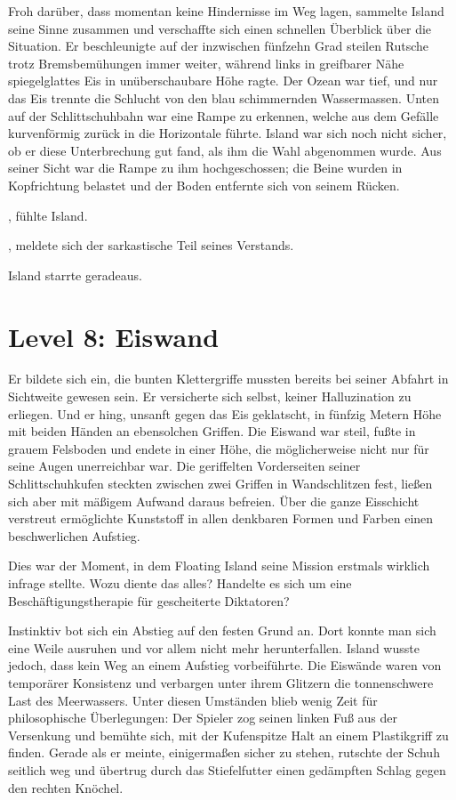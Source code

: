 Froh darüber, dass momentan keine Hindernisse im Weg lagen, sammelte Island seine Sinne zusammen und verschaffte sich einen schnellen Überblick über die Situation. Er beschleunigte auf der inzwischen fünfzehn Grad steilen Rutsche trotz Bremsbemühungen immer weiter, während links in greifbarer Nähe spiegelglattes Eis in unüberschaubare Höhe ragte. Der Ozean war tief, und nur das Eis trennte die Schlucht von den blau schimmernden Wassermassen. Unten auf der Schlittschuhbahn war eine Rampe zu erkennen, welche aus dem Gefälle kurvenförmig zurück in die Horizontale führte. Island war sich noch nicht sicher, ob er diese Unterbrechung gut fand, als ihm die Wahl abgenommen wurde. Aus seiner Sicht war die Rampe zu ihm hochgeschossen; die Beine wurden in Kopfrichtung belastet und der Boden entfernte sich von seinem Rücken.

, fühlte Island. 

, meldete sich der sarkastische Teil seines Verstands.

Island starrte geradeaus. 

\section{Level 8: Eiswand}

Er bildete sich ein, die bunten Klettergriffe mussten bereits bei seiner Abfahrt in Sichtweite gewesen sein. Er versicherte sich selbst, keiner Halluzination zu erliegen. Und er hing, unsanft gegen das Eis geklatscht, in fünfzig Metern Höhe mit beiden Händen an ebensolchen Griffen. Die Eiswand war steil, fußte in grauem Felsboden und endete in einer Höhe, die möglicherweise nicht nur für seine Augen unerreichbar war. Die geriffelten Vorderseiten seiner Schlittschuhkufen steckten zwischen zwei Griffen in Wandschlitzen fest, ließen sich aber mit mäßigem Aufwand daraus befreien. Über die ganze Eisschicht verstreut ermöglichte Kunststoff in allen denkbaren Formen und Farben einen beschwerlichen Aufstieg.

Dies war der Moment, in dem Floating Island seine Mission erstmals wirklich infrage stellte. Wozu diente das alles? Handelte es sich um eine Beschäftigungstherapie für gescheiterte Diktatoren?

Instinktiv bot sich ein Abstieg auf den festen Grund an. Dort konnte man sich eine Weile ausruhen und vor allem nicht mehr herunterfallen. Island wusste jedoch, dass kein Weg an einem Aufstieg vorbeiführte. Die Eiswände waren von temporärer Konsistenz und verbargen unter ihrem Glitzern die tonnenschwere Last des Meerwassers. Unter diesen Umständen blieb wenig Zeit für philosophische Überlegungen: Der Spieler zog seinen linken Fuß aus der Versenkung und bemühte sich, mit der Kufenspitze Halt an einem Plastikgriff zu finden. Gerade als er meinte, einigermaßen sicher zu stehen, rutschte der Schuh seitlich weg und übertrug durch das Stiefelfutter einen gedämpften Schlag gegen den rechten Knöchel.

